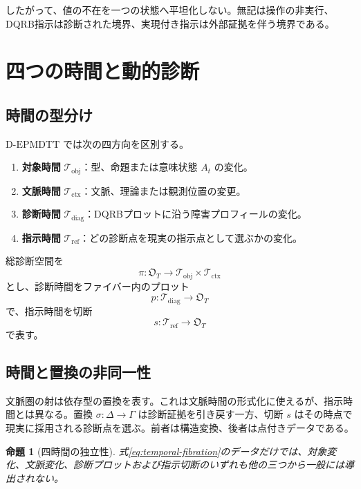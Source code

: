 \documentclass[a4paper,11pt]{ltjsarticle}
\theoremstyle{definition}
\theoremstyle{plain}
\newtheorem{proposition}[definition]{命題}
\newcommand{\DEPMDTT}{\mathrm{D}\text{-}\mathrm{EPMDTT}}
\begin{document}
したがって、値の不在を一つの状態へ平坦化しない。無記は操作の非実行、DQRB指示は診断された境界、実現付き指示は外部証拠を伴う境界である。

\section{四つの時間と動的診断}

\subsection{時間の型分け}

$\DEPMDTT$ では次の四方向を区別する。
\begin{enumerate}
 \item \textbf{対象時間} $\mathcal T_{\mathrm{obj}}$：型、命題または意味状態 $A_t$ の変化。
 \item \textbf{文脈時間} $\mathcal T_{\mathrm{ctx}}$：文脈、理論または観測位置の変更。
 \item \textbf{診断時間} $\mathcal T_{\mathrm{diag}}$：DQRBプロットに沿う障害プロフィールの変化。
 \item \textbf{指示時間} $\mathcal T_{\mathrm{ref}}$：どの診断点を現実の指示点として選ぶかの変化。
\end{enumerate}

総診断空間を
\begin{equation}
 \pi:\mathfrak O_T\longrightarrow
 \mathcal T_{\mathrm{obj}}\times
 \mathcal T_{\mathrm{ctx}}
 \label{eq:temporal-fibration}
\end{equation}
とし、診断時間をファイバー内のプロット
\begin{equation}
 p:\mathcal T_{\mathrm{diag}}
 \longrightarrow\mathfrak O_T
\end{equation}
で、指示時間を切断
\begin{equation}
 s:\mathcal T_{\mathrm{ref}}
 \longrightarrow\mathfrak O_T
\end{equation}
で表す。

\subsection{時間と置換の非同一性}

文脈圏の射は依存型の置換を表す。これは文脈時間の形式化に使えるが、指示時間とは異なる。置換 $\sigma:\Delta\to\Gamma$ は診断証拠を引き戻す一方、切断 $s$ はその時点で現実に採用される診断点を選ぶ。前者は構造変換、後者は点付きデータである。

\begin{proposition}[四時間の独立性]
式\eqref{eq:temporal-fibration}のデータだけでは、対象変化、文脈変化、診断プロットおよび指示切断のいずれも他の三つから一般には導出されない。
\end{proposition}
\end{document}
